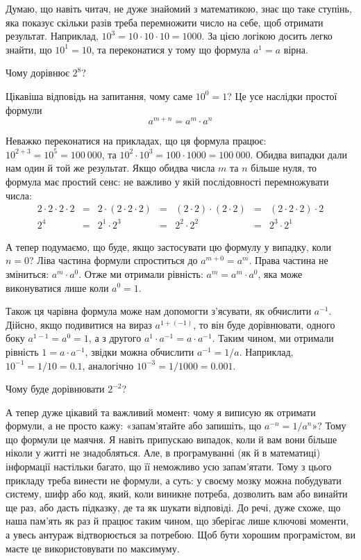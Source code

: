 \documentclass{book}
\begin{document}
Думаю, що навіть читач, не дуже знайомий з математикою, знає що таке ступінь, яка показує скільки разів треба перемножити число на себе, щоб отримати результат.
Наприклад, $10^3=10 \cdot 10 \cdot 10 = 1000$.
За цією логікою досить легко знайти, що $10^1 = 10$, та переконатися у тому що формула $a^1=a$ вірна.

\begin{exercise}
Чому дорівнює $2^8$?
\end{exercise}

Цікавіша відповідь на запитання, чому саме $10^0=1$?
Це усе наслідки простої формули
\begin{equation} a^{m+n} = a^m \cdot a^n \label{FormulaPowerAddition} \end{equation}

Неважко переконатися на прикладах, що ця формула працює: $10^{2+3} = 10^5 = 100~000$, та $10^2 \cdot 10^3 = 100 \cdot 1000 = 100~000$.
Обидва випадки дали нам один й той же результат.
Якщо обидва числа $m$ та $n$ більше нуля, то формула має простий сенс: не важливо у якій послідовності перемножувати числа:
$$ \begin{array}{ccccccc}
2\cdot2\cdot2\cdot2 &=& 2\cdot(2\cdot2\cdot2) &=& (2\cdot2)\cdot(2\cdot2) &=& (2\cdot2\cdot2)\cdot2 \\
2^4 &=& 2^1 \cdot 2^3 &=& 2^2 \cdot 2^2 &=& 2^3 \cdot 2^1
\end{array} $$

А тепер подумаємо, що буде, якщо застосувати цю формулу у випадку, коли $n=0$?
Ліва частина формули спроститься до $a^{m+0} = a^m$.
Права частина не зміниться: $a^m \cdot a^0$.
Отже ми отримали рівність: $a^m = a^m \cdot a^0$, яка може виконуватися лише коли $a^0=1$.

Також ця чарівна формула може нам допомогти з'ясувати, як обчислити $a^{-1}$.
Дійсно, якщо подивитися на вираз $a^{1+(-1)}$, то він буде дорівнювати, одного боку $a^{1-1}=a^0=1$, а з другого $a^1 \cdot a^{-1} = a \cdot a^{-1}$.
Таким чином, ми отримали рівність $1 = a \cdot a^{-1}$, звідки можна обчислити $a^{-1} = 1/a$.
Наприклад, $10^{-1} = 1/10 = 0.1$, аналогічно $10^{-3} = 1/1000 = 0.001$.

\begin{exercise}
Чому буде дорівнювати $2^{-2}$?
\end{exercise}

А тепер дуже цікавий та важливий момент: чому я виписую як отримати формули, а не просто кажу: «запам'ятайте або запишіть, що $a^{-n}=1/a^n$»?
Тому що формули це маячня.
Я навіть припускаю випадок, коли й вам вони більше ніколи у житті не знадобляться.
Але, в програмуванні (як й в математиці) інформації настільки багато, що її неможливо усю запам'ятати.
Тому з цього прикладу треба винести не формули, а суть: у своєму мозку можна побудувати систему, шифр або код, який, коли виникне потреба, дозволить вам або винайти ще раз, або дасть підказку, де та як шукати відповіді.
До речі, дуже схоже, що наша пам'ять як раз й працює таким чином, що зберігає лише ключові моменти, а увесь антураж відтворюється за потребою.
Щоб бути хорошим програмістом, ви маєте це використовувати по максимуму.
\end{document}
